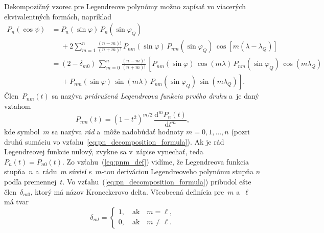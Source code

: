 \documentclass[a4paper,12pt]{book}
\newcommand{\diff}{\mathrm d}
\begin{document}
Dekompozičný vzorec pre Legendreove polynómy možno zapísať vo viacerých
ekvivalentných formách, napríklad
\parencite{Hobson,MoritzPhysicalGeodesy,SansoGeoidDetermination}
%
\begin{equation}
\label{eq:pn_decomposition_formula}
\begin{split}
P_n(\cos\psi) &= P_n(\sin\varphi) \, P_n(\sin\varphi_Q)\\
%
&\phantom{={}} +2 \sum_{m = 1}^{n} \frac{(n - m)!}{(n + m)!} \,
P_{nm}(\sin\varphi) \, P_{nm}(\sin\varphi_Q) \, \cos\left[m (\lambda
- \lambda_Q) \right]\\
%
&= (2 - \delta_{m0}) \, \sum_{m = 0}^{n} \frac{(n - m)!}{(n + m)!} \, \left[
P_{nm}(\sin\varphi) \, \cos(m\lambda) \, P_{nm}(\sin\varphi_Q) \,
\cos(m\lambda_Q)\right.\\
%
&\phantom{={}}+\left. P_{nm}(\sin\varphi) \, \sin(m\lambda) \,
P_{nm}(\sin\varphi_Q) \, \sin(m\lambda_Q)\right]{.}
\end{split}
\end{equation}
%
Člen~$P_{nm}(t)$ sa nazýva \emph{pridružená Legendreova funkcia prvého druhu}
a~je daný vzťahom
%
\begin{equation}
\label{eq:pnm_def}
P_{nm}(t) = (1 - t^2)^{m \slash 2} \, \frac{\diff^m P_n(t)}{\diff t^m}{,}
\end{equation}
%
kde symbol~$m$ sa nazýva \emph{rád} a~môže nadobúdať hodnoty $m = 0, 1, \dots, 
n$ (pozri druhú sumáciu vo vzťahu~\ref{eq:pn_decomposition_formula}).  Ak je 
rád Legendreovej funkcie nulový, zvykne sa v~zápise vynechať, teda $P_n(t) 
= P_{n0}(t)$.  Zo vzťahu~(\ref{eq:pnm_def}) vidíme, že Legendreova funkcia 
stupňa~$n$ a~rádu~$m$ súvisí s~$m$-tou deriváciou Legendreoveho polynómu stupňa 
$n$ podľa premennej~$t$.  Vo vzťahu~(\ref{eq:pn_decomposition_formula}) 
pribudol ešte člen~$\delta_{m0}$, ktorý má názov Kroneckerovo delta.  Všeobecná 
definícia pre~$m$ a~$\ell$ má tvar
%
\begin{equation}
\delta_{ml} =
%
\begin{cases}
1{,} \quad \mathrm{ak} \quad m = \ell{,}\\
0{,} \quad \mathrm{ak} \quad m \neq \ell{.}
\end{cases}
\end{equation}
\end{document}
